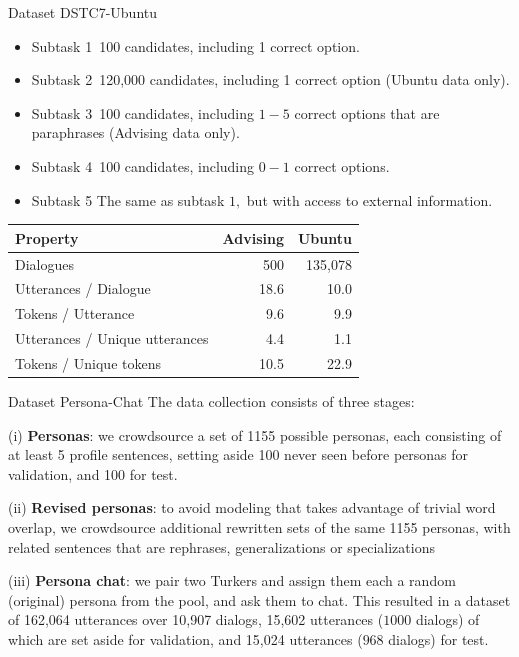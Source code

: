 \documentclass{beamer}
\begin{document}
\begin{frame}{Dataset DSTC7-Ubuntu}
    \begin{itemize}
        \item Subtask 1\ 100 candidates, including 1 correct option.
\item Subtask 2\ 120,000 candidates, including 1 correct option (Ubuntu data only).

\item Subtask 3\ 100 candidates, including $1-5$ correct options that are paraphrases (Advising data only).
\item Subtask 4\ 100 candidates, including $0-1$ correct options.
\item Subtask 5 The same as subtask $1,$ but with access to external information.
    \end{itemize}

    \begin{center}\tiny
        \begin{tabular}{lrr}
\hline Property & Advising & Ubuntu \\
\hline \hline Dialogues & 500 & 135,078 \\
Utterances / Dialogue & 18.6 & 10.0 \\
Tokens / Utterance & 9.6 & 9.9 \\
Utterances / Unique utterances & 4.4 & 1.1 \\
Tokens / Unique tokens & 10.5 & 22.9 \\
\hline
\end{tabular}
    \end{center}
\end{frame}

\begin{frame}{Dataset Persona-Chat}
The data collection consists of three stages:

(i) \textbf{Personas}: we crowdsource a set of 1155 possible personas, each consisting of at least 5 profile sentences, setting aside 100 never seen before personas for validation, and 100 for test.


(ii) \textbf{Revised personas}: to avoid modeling that takes advantage of trivial word overlap, we crowdsource additional rewritten sets of the same 1155 personas, with related sentences that are rephrases, generalizations or specializations


(iii) \textbf{Persona chat}: we pair two Turkers and assign them each a random (original) persona from the pool, and ask them to chat. This resulted in a dataset of 162,064 utterances over 10,907 dialogs, 15,602 utterances ($1000$ dialogs) of which are set aside for validation, and 15,024 utterances ($968$ dialogs) for test.
\end{frame}
\end{document}
